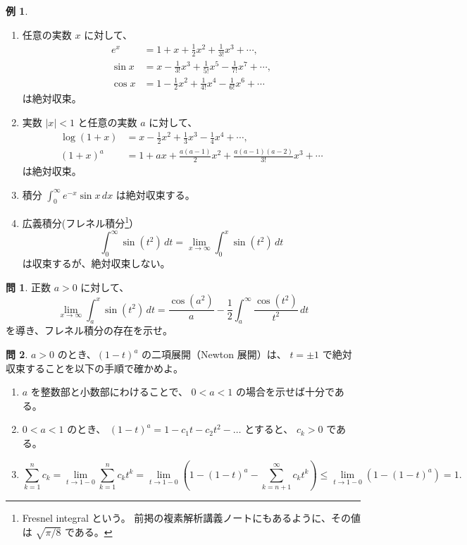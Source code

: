 \documentclass[a4paper]{jsarticle}
\theoremstyle{definition}
\newtheorem{Example}[Theorem]{例}
\newtheorem{Exercise}{問}%
\theoremstyle{remark}
\begin{document}
\begin{Example}~ 
\begin{enumerate}
\item 
任意の実数 $x$ に対して、
  \begin{align*}
e^x &= 1 + x + \frac{1}{2}x^2 + \frac{1}{3!} x^3 + \cdots,\\
\sin x &= x - \frac{1}{3!} x^3 + \frac{1}{5!} x^5 - \frac{1}{7!} x^7 + \cdots,\\
\cos x &= 1 - \frac{1}{2}x^2 + \frac{1}{4!} x^4 - \frac{1}{6!} x^6 +\cdots
  \end{align*}
は絶対収束。
\item 
実数 $|x| < 1$ と任意の実数 $a$ に対して、
\begin{align*}
\log(1+x) &= x - \frac{1}{2} x^2 + \frac{1}{3} x^3 - 
\frac{1}{4} x^4 + \cdots,\\
(1+x)^a &= 1 + ax + \frac{a(a-1)}{2} x^2 + 
\frac{a(a-1)(a-2)}{3!} x^3 + \cdots  
\end{align*}
は絶対収束。
\item 
積分
$\displaystyle \int_0^\infty e^{-x} \sin x\, dx$ は絶対収束する。
\item 
広義積分(フレネル積分\footnote{Fresnel integral という。
前掲の複素解析講義ノートにもあるように、その値は $\sqrt{\pi/8}$ である。}）
\[
\int_0^\infty \sin(t^2)\, dt = \lim_{x \to \infty} \int_0^x \sin(t^2)\, dt
\]
は収束するが、絶対収束しない。
\end{enumerate}
\end{Example}

\begin{Exercise}
正数 $a>0$ に対して、
\[
\lim_{x \to \infty} \int_a^x \sin (t^2)\, dt 
= \frac{\cos(a^2)}{a} - \frac{1}{2} \int_a^\infty \frac{\cos(t^2)}{t^2}\, dt 
\]
を導き、フレネル積分の存在を示せ。
\end{Exercise} 

\begin{Exercise}
$a > 0$ のとき、$(1-t)^a$ の二項展開（Newton 展開）は、
$t = \pm 1$ で絶対収束することを以下の手順で確かめよ。
\begin{enumerate}
\item
$a$ を整数部と小数部にわけることで、
$0<a<1$ の場合を示せば十分である。
\item
$0<a<1$ のとき、
$(1-t)^a = 1 - c_1t - c_2 t^2 - \dots$ とすると、
$c_k > 0$ である。
\item 
\[
\sum_{k=1}^n c_k = \lim_{t \to 1-0} \sum_{k=1}^n c_kt^k 
= \lim_{t \to 1-0} 
\left(
1 - (1-t)^a - \sum_{k=n+1}^\infty c_k t^k
\right)
\leq \lim_{t \to 1-0} 
\left(
1 - (1-t)^a 
\right) = 1. 
\]
\end{enumerate}
\end{Exercise}
\end{document}
